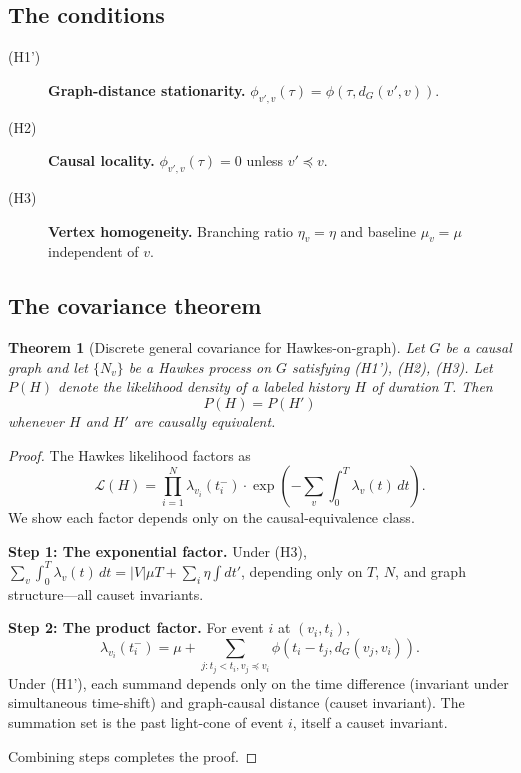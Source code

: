 \documentclass[11pt,a4paper]{article}
\newtheorem{theorem}{Theorem}
\begin{document}
\subsection{The conditions}

\begin{description}
\item[(H1')] \textbf{Graph-distance stationarity.} $\phi_{v',v}(\tau) = \phi(\tau, d_G(v', v))$.
\item[(H2)] \textbf{Causal locality.} $\phi_{v',v}(\tau) = 0$ unless $v' \preceq v$.
\item[(H3)] \textbf{Vertex homogeneity.} Branching ratio $\eta_v = \eta$ and baseline $\mu_v = \mu$ independent of $v$.
\end{description}

\subsection{The covariance theorem}

\begin{theorem}[Discrete general covariance for Hawkes-on-graph]
\label{thm:dgc}
Let $G$ be a causal graph and let $\{N_v\}$ be a Hawkes process on $G$ satisfying (H1'), (H2), (H3). Let $P(H)$ denote the likelihood density of a labeled history $H$ of duration $T$. Then
\begin{equation}
P(H) = P(H')
\end{equation}
whenever $H$ and $H'$ are causally equivalent.
\end{theorem}

\begin{proof}
The Hawkes likelihood factors as
\begin{equation}
\mathcal{L}(H) = \prod_{i=1}^N \lambda_{v_i}(t_i^-) \cdot \exp\left(-\sum_v \int_0^T \lambda_v(t)\, dt\right).
\end{equation}
We show each factor depends only on the causal-equivalence class.

\textbf{Step 1: The exponential factor.} Under (H3), $\sum_v \int_0^T \lambda_v(t)\,dt = |V|\mu T + \sum_i \eta \int dt'$, depending only on $T$, $N$, and graph structure---all causet invariants.

\textbf{Step 2: The product factor.} For event $i$ at $(v_i, t_i)$,
\begin{equation}
\lambda_{v_i}(t_i^-) = \mu + \sum_{j: t_j < t_i, v_j \preceq v_i} \phi(t_i - t_j, d_G(v_j, v_i)).
\end{equation}
Under (H1'), each summand depends only on the time difference (invariant under simultaneous time-shift) and graph-causal distance (causet invariant). The summation set is the past light-cone of event $i$, itself a causet invariant.

Combining steps completes the proof.
\end{proof}
\end{document}
